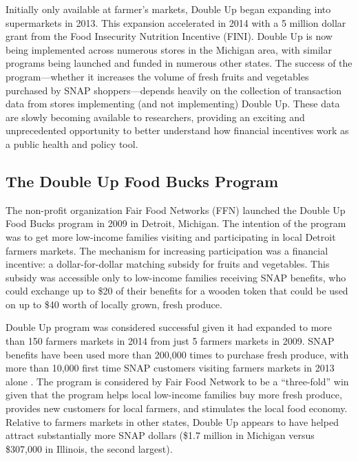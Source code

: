 \documentclass[11pt,letterpaperpaper,]{book}
\begin{document}
Initially only available at farmer's markets, Double Up began expanding
into supermarkets in 2013. This expansion accelerated in 2014 with a 5
million dollar grant from the Food Insecurity Nutrition Incentive
(FINI). Double Up is now being implemented across numerous stores in the
Michigan area, with similar programs being launched and funded in
numerous other states. The success of the program---whether it increases
the volume of fresh fruits and vegetables purchased by SNAP
shoppers---depends heavily on the collection of transaction data from
stores implementing (and not implementing) Double Up. These data are
slowly becoming available to researchers, providing an exciting and
unprecedented opportunity to better understand how financial incentives
work as a public health and policy tool.

\subsection{The Double Up Food Bucks
Program}\label{the-double-up-food-bucks-program}

The non-profit organization Fair Food Networks (FFN) launched the Double
Up Food Bucks program in 2009 in Detroit, Michigan. The intention of the
program was to get more low-income families visiting and participating
in local Detroit farmers markets. The mechanism for increasing
participation was a financial incentive: a dollar-for-dollar matching
subsidy for fruits and vegetables. This subsidy was accessible only to
low-income families receiving SNAP benefits, who could exchange up to
\$20 of their benefits for a wooden token that could be used on up to
\$40 worth of locally grown, fresh produce.

Double Up program was considered successful given it had expanded to
more than 150 farmers markets in 2014 from just 5 farmers markets in
2009. SNAP benefits have been used more than 200,000 times to purchase
fresh produce, with more than 10,000 first time SNAP customers visiting
farmers markets in 2013 alone \citep{fair_food_network_double_2014}. The
program is considered by Fair Food Network to be a ``three-fold'' win
given that the program helps local low-income families buy more fresh
produce, provides new customers for local farmers, and stimulates the
local food economy. Relative to farmers markets in other states, Double
Up appears to have helped attract substantially more SNAP dollars (\$1.7
million in Michigan versus \$307,000 in Illinois, the second largest).
\end{document}
